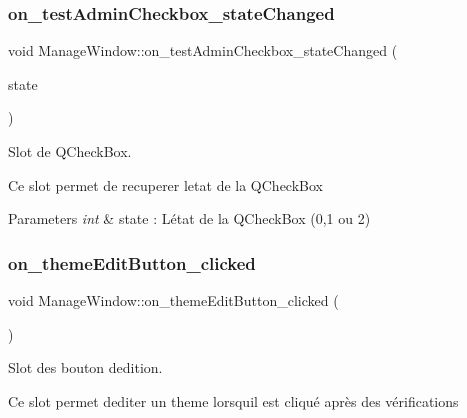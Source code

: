 \subsubsection{\texorpdfstring{on\+\_\+test\+Admin\+Checkbox\+\_\+state\+Changed}{on\_testAdminCheckbox\_stateChanged}}
{\footnotesize\ttfamily void Manage\+Window\+::on\+\_\+test\+Admin\+Checkbox\+\_\+state\+Changed (\begin{DoxyParamCaption}\item[{int}]{state }\end{DoxyParamCaption})\hspace{0.3cm}{\ttfamily [slot]}}



Slot de Q\+Check\+Box. 

Ce slot permet de recuperer l\textquotesingle{}etat de la Q\+Check\+Box 
\begin{DoxyParams}{Parameters}
{\em int} & state \+: L\textquotesingle{}état de la Q\+Check\+Box (0,1 ou 2) \\
\hline
\end{DoxyParams}
\mbox{\label{classManageWindow_aed7adfd94929cb522de43f1aa3314483}} 
\subsubsection{\texorpdfstring{on\+\_\+theme\+Edit\+Button\+\_\+clicked}{on\_themeEditButton\_clicked}}
{\footnotesize\ttfamily void Manage\+Window\+::on\+\_\+theme\+Edit\+Button\+\_\+clicked (\begin{DoxyParamCaption}{ }\end{DoxyParamCaption})\hspace{0.3cm}{\ttfamily [slot]}}



Slot des bouton d\textquotesingle{}edition. 

Ce slot permet d\textquotesingle{}editer un theme lorsqu\textquotesingle{}il est cliqué après des vérifications \mbox{\label{classManageWindow_a642bd872d6a3e0ff95cc41cd57d4baa2}} 
